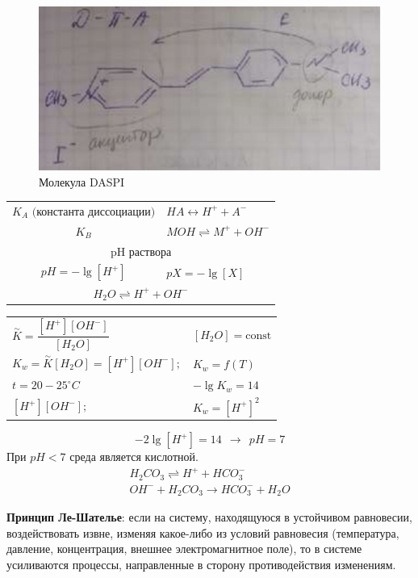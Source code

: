\begin{lecture}
\begin{lecSection}
	\begin{figure}[h]
		\centering
		\includegraphics[width=0.7\linewidth]{lecture_04/daspi}
		\caption[Молекула DASPI]{Молекула DASPI}
		\label{fig:daspi}
	\end{figure}
	
	\begin{center}\begin{tabular}{cl}
		$ K_A \text{ (константа диссоциации)}$ & $HA \leftrightarrow H^+  + A^- $ \\
		$K_B$ & $MOH \rightleftharpoons M^+ + OH^- $ \\
		\multicolumn{2}{c}{$\text{pH раствора} $} \\
		$pH = - \lg [H^+]$ & $pX = - \lg [X] $ \\
		\multicolumn{2}{c}{$H_2O \rightleftharpoons H^+ + OH^- $} \\
	\end{tabular}\end{center}
	\begin{center}\begin{tabular}{ll}
	$ \overset{\sim}{K} = \dfrac{[H^+][OH^-]}{[H_2O]} $ & $ [H_2O] = \text{const} $ \\
	$ K_w = \overset{\sim}{K} [H_2O] = [H^+][OH^-]; $ & $ K_w = f(T) $ \\
	$ t = 20 - 25 ^\circ C $ & $ -\lg K_w = 14 $ \\
	$ [H^+][OH^-]; $ & $ K_w = [H^+]^2 $
	\end{tabular}\end{center}
	\[ -2 \lg [H^+]  = 14 ~~ \rightarrow ~~ pH = 7 \]
	При $ pH < 7 $ среда является кислотной.
	\begin{gather*}
	H_2 CO_3 \rightleftharpoons H^+ + HCO_3^- \\
	OH^- + H_2 CO_3 \rightarrow HCO_3^- + H_2O
	\end{gather*}
	
	\textbf{Принцип Ле-Шателье}: если на систему, находящуюся в устойчивом равновесии, воздействовать извне, изменяя какое-либо из условий равновесия (температура, давление, концентрация, внешнее электромагнитное поле), то в системе усиливаются процессы, направленные в сторону противодействия изменениям.
	

\end{lecSection}
\end{lecture}
